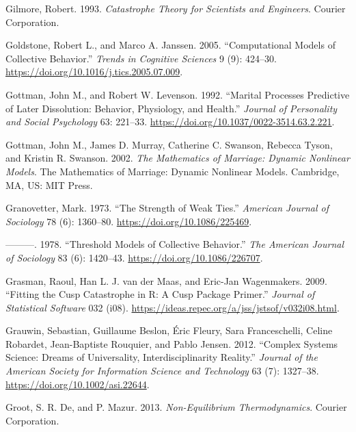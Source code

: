 \documentclass[
  a4paper,
  DIV=11,
  numbers=noendperiod,
  oneside]{scrreprt}
\newlength{\cslhangindent}
\newenvironment{CSLReferences}[2] %
 {\begin{list}{}{%
  \setlength{\itemindent}{0pt}
  \setlength{\leftmargin}{0pt}
  \setlength{\parsep}{0pt}
  \ifodd #1
   \setlength{\leftmargin}{\cslhangindent}
   \setlength{\itemindent}{-1\cslhangindent}
  \fi
  \setlength{\itemsep}{#2\baselineskip}}}
 {\end{list}}
\begin{document}
\begin{CSLReferences}{1}{0}
Gilmore, Robert. 1993. \emph{Catastrophe {Theory} for {Scientists} and
{Engineers}}. {Courier Corporation}.

Goldstone, Robert L., and Marco A. Janssen. 2005. {``Computational
Models of Collective Behavior.''} \emph{Trends in Cognitive Sciences} 9
(9): 424--30. \url{https://doi.org/10.1016/j.tics.2005.07.009}.

Gottman, John M., and Robert W. Levenson. 1992. {``Marital Processes
Predictive of Later Dissolution: {Behavior}, Physiology, and Health.''}
\emph{Journal of Personality and Social Psychology} 63: 221--33.
\url{https://doi.org/10.1037/0022-3514.63.2.221}.

Gottman, John M., James D. Murray, Catherine C. Swanson, Rebecca Tyson,
and Kristin R. Swanson. 2002. \emph{The Mathematics of Marriage:
{Dynamic} Nonlinear Models}. The Mathematics of Marriage: {Dynamic}
Nonlinear Models. {Cambridge, MA, US}: {MIT Press}.

Granovetter, Mark. 1973. {``The Strength of Weak Ties.''} \emph{American
Journal of Sociology} 78 (6): 1360--80.
\url{https://doi.org/10.1086/225469}.

---------. 1978. {``Threshold {Models} of {Collective Behavior}.''}
\emph{The American Journal of Sociology} 83 (6): 1420--43.
\url{https://doi.org/10.1086/226707}.

Grasman, Raoul, Han L. J. van der Maas, and Eric-Jan Wagenmakers. 2009.
{``Fitting the Cusp Catastrophe in R: A Cusp Package Primer.''}
\emph{Journal of Statistical Software} 032 (i08).
\url{https://ideas.repec.org/a/jss/jstsof/v032i08.html}.

Grauwin, Sebastian, Guillaume Beslon, Éric Fleury, Sara Franceschelli,
Celine Robardet, Jean-Baptiste Rouquier, and Pablo Jensen. 2012.
{``Complex Systems Science: {Dreams} of Universality,
Interdisciplinarity Reality.''} \emph{Journal of the American Society
for Information Science and Technology} 63 (7): 1327--38.
\url{https://doi.org/10.1002/asi.22644}.

Groot, S. R. De, and P. Mazur. 2013. \emph{Non-Equilibrium
Thermodynamics}. Courier Corporation.


\end{CSLReferences}
\end{document}
